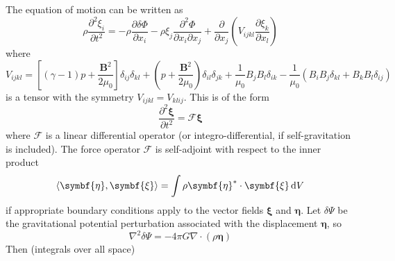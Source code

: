 \documentclass{jknotes}
\newcommand{\B}{\symbf{B}}
\newcommand{\disp}{\symbf{\xi}}
\begin{document}
The equation of motion can be written as
\begin{equation}
	\rho \frac{\partial^2 \xi_i}{\partial t^2} = -\rho \frac{\partial \delta
	\Phi}{\partial x_i} - \rho \xi_j \frac{\partial^2 \Phi}{\partial x_i
	\partial x_j} + \frac{\partial}{\partial x_j} \left( V_{ijkl} \frac{\partial
	\xi_k}{\partial x_l}\right)
\end{equation}
where
\begin{equation}
	V_{ijkl} = \left[ (\gamma -1)p + \frac{\B^2}{2\mu_0}\right] \delta_{ij}
	\delta_{kl} + \left( p + \frac{\B^2}{2\mu_0}\right) \delta_{il}
	\delta_{jk} + \frac{1}{\mu_0} B_j B_l \delta_{ik} - \frac{1}{\mu_0}(B_i
	B_j \delta_{kl} + B_k B_l \delta_{ij})
\end{equation}
is a tensor with the symmetry $V_{ijkl} = V_{klij}$. This is of the form
\begin{equation}
	\frac{\partial^2 \disp}{\partial t^2} = \mathcal{F} \disp \label{eq:l19:1}
\end{equation}
where $\mathcal{F}$ is a linear differential operator (or
integro-differential, if self-gravitation is included). The force operator
$\mathcal{F}$ is self-adjoint with respect to the inner product
\begin{equation}
	\langle \symbf{\eta}, \disp \rangle = \int \rho \symbf{\eta}^* \cdot \disp
	\, \diffd V
\end{equation}
if appropriate boundary conditions apply to the vector fields $\disp$ and
$\symbf{\eta}$. Let $\delta \Psi$ be the gravitational potential perturbation
associated with the displacement $\symbf{\eta}$, so
\begin{equation}
	\nabla^2 \delta \Psi = -4\pi G \nabla \cdot (\rho \symbf{\eta})
\end{equation}
Then (integrals over all space)
\end{document}
